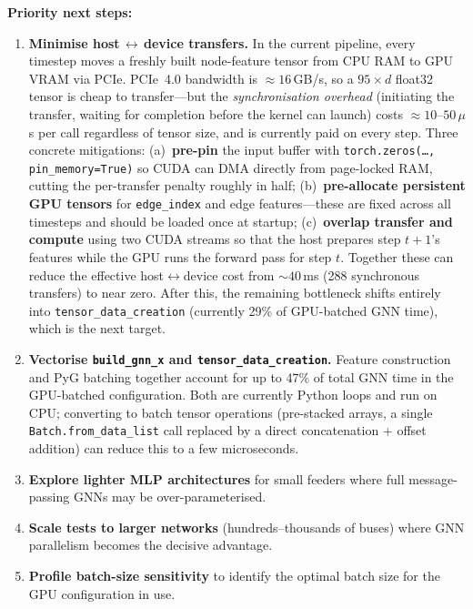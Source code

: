 \documentclass[11pt]{article}
\begin{document}
\medskip
\noindent\textbf{Priority next steps:}
\begin{enumerate}[itemsep=3pt]
  \item \textbf{Minimise host\,$\leftrightarrow$\,device transfers.}
        In the current pipeline, every timestep moves a freshly built
        node-feature tensor from CPU RAM to GPU VRAM via PCIe.
        PCIe~4.0 bandwidth is ${\approx}16$\,GB/s, so a $95\times d$
        float32 tensor is cheap to transfer---but the \emph{synchronisation
        overhead} (initiating the transfer, waiting for completion before
        the kernel can launch) costs ${\approx}10$--$50\,\mu$s per call
        regardless of tensor size, and is currently paid on every step.
        Three concrete mitigations: (a)~\textbf{pre-pin} the input buffer
        with \texttt{torch.zeros(\ldots, pin\_memory=True)} so
        CUDA can DMA directly from page-locked RAM, cutting the per-transfer
        penalty roughly in half; (b)~\textbf{pre-allocate persistent GPU
        tensors} for \texttt{edge\_index} and edge features---these are
        fixed across all timesteps and should be loaded once at startup;
        (c)~\textbf{overlap transfer and compute} using two CUDA streams
        so that the host prepares step $t{+}1$'s features while the GPU
        runs the forward pass for step $t$.  Together these can reduce
        the effective host$\leftrightarrow$device cost from ${\sim}40$\,ms
        (288 synchronous transfers) to near zero.
        After this, the remaining bottleneck shifts entirely into
        \texttt{tensor\_data\_creation} (currently 29\% of GPU-batched
        GNN time), which is the next target.

  \item \textbf{Vectorise \texttt{build\_gnn\_x} and \texttt{tensor\_data\_creation}.}
        Feature construction and PyG batching together account for up to 47\% of
        total GNN time in the GPU-batched configuration.  Both are currently
        Python loops and run on CPU; converting to batch tensor operations
        (pre-stacked arrays, a single \texttt{Batch.from\_data\_list} call
        replaced by a direct concatenation + offset addition) can reduce
        this to a few microseconds.

  \item \textbf{Explore lighter MLP architectures} for small feeders where full
        message-passing GNNs may be over-parameterised.

  \item \textbf{Scale tests to larger networks} (hundreds--thousands of buses)
        where GNN parallelism becomes the decisive advantage.

  \item \textbf{Profile batch-size sensitivity} to identify the optimal batch
        size for the GPU configuration in use.
\end{enumerate}
\end{document}
